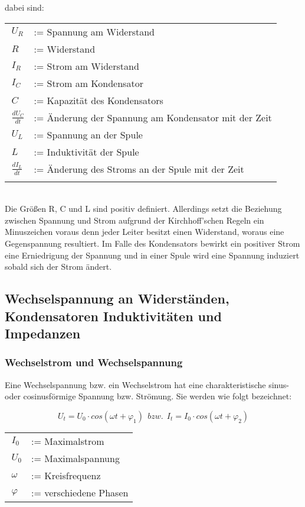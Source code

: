 \documentclass{article}
\begin{document}
dabei sind: \vspace{0,5cm}

\begin{tabular}{l l}
\(\ U_{R}\) & := Spannung am Widerstand\\
\(\ R\)		& := Widerstand\\
\(\ I_{R}\)	& := Strom am Widerstand\\
\(\ I_{C}\)	& := Strom am Kondensator\\
\(\ C\)		& := Kapazität des Kondensators\\
\(\ \frac{dU_{C}}{dt}\)	& := Änderung der Spannung am Kondensator mit der Zeit\\
\(\ U_{L}\)	& := Spannung an der Spule\\
\(\ L\)		& := Induktivität der Spule\\
\(\ \frac{dI_{L}}{dt}\)	& := Änderung des Stroms an der Spule mit der Zeit\\
\vspace{0,5cm}
\end{tabular}\\

Die Größen R, C und L sind positiv definiert. Allerdings setzt die Beziehung zwischen Spannung und Strom aufgrund der Kirchhoff'schen Regeln ein Minuszeichen voraus denn jeder Leiter besitzt einen Widerstand, woraus eine Gegenspannung resultiert. Im Falle des Kondensators bewirkt ein positiver Strom eine Erniedrigung der Spannung und in einer Spule wird eine Spannung induziert sobald sich der Strom ändert.

\subsection{Wechselspannung an Widerständen, Kondensatoren 
Induktivitäten und Impedanzen }
\subsubsection{Wechselstrom und Wechselspannung}
Eine Wechselspannung bzw. ein Wechselstrom hat eine charakteristische sinus- oder cosinusförmige Spannung bzw. Strömung. Sie werden wie folgt bezeichnet:

\begin{equation}
\label{4}
U_{t}=U_{0}\cdot cos(\omega t+\varphi _{1})\ \ bzw.\ \ I_{t}=I_{0}\cdot cos(\omega t+\varphi _{2})
\end{equation}

\begin{tabular}{l l}
\(\ I_{0}\)	&	:= Maximalstrom\\
\(\ U_{0}\) &	:= Maximalspannung\\
\(\ \omega\)&	:= Kreisfrequenz\\
\(\ \varphi\)&	:= verschiedene Phasen
\end{tabular}\\
\end{document}
